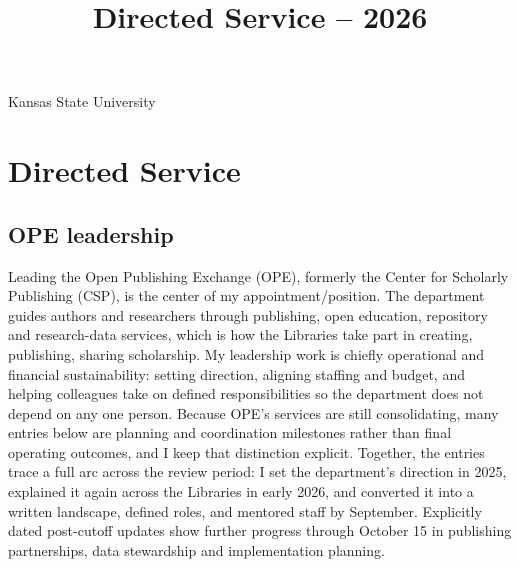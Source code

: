 \title{Directed Service -- 2026}
\address{University Library}{Kansas State University}
\portfoliotitle

\begingroup
\setlength{\parindent}{1.5em}
\setlength{\parskip}{0.45em}

\section{Directed Service}

\subsection{OPE leadership}
Leading the Open Publishing Exchange (OPE), formerly the Center for Scholarly Publishing (CSP), is the center of my appointment/position. The department guides authors and researchers through publishing, open education, repository and research-data services, which is how the Libraries take part in creating, publishing, sharing  scholarship. My leadership work is chiefly operational and financial sustainability: setting direction, aligning staffing and budget, and helping colleagues take on defined responsibilities so the department does not depend on any one person. Because OPE's services are still consolidating, many entries below are planning and coordination milestones rather than final operating outcomes, and I keep that distinction explicit. Together, the entries trace a full arc across the review period: I set the department's direction in 2025, explained it again across the Libraries in early 2026, and converted it into a written landscape, defined roles, and mentored staff by September. Explicitly dated post-cutoff updates show further progress through October 15 in publishing partnerships, data stewardship and implementation planning.

